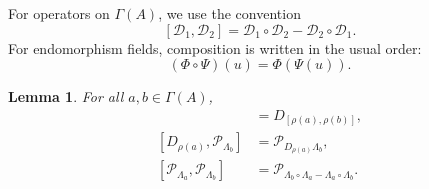 \documentclass[12pt,reqno]{amsart}
\newtheorem{lemma}[thm]{Lemma}
\theoremstyle{definition}
\theoremstyle{remark}
\begin{document}
For operators on \(\Gamma(A)\), we use the convention
\[
[\mathcal D_1,\mathcal D_2]
=
\mathcal D_1\circ\mathcal D_2
-
\mathcal D_2\circ\mathcal D_1.
\]
For endomorphism fields, composition is written in the usual order:
\[
(\Phi\circ\Psi)(u)=\Phi(\Psi(u)).
\]

\begin{lemma}
For all \(a,b\in\Gamma(A)\),
\begin{align}
[D_{\rho(a)},D_{\rho(b)}]
&=
D_{[\rho(a),\rho(b)]},
\label{eq:DD-commutator}
\\
[D_{\rho(a)},\mathcal P_{\Lambda_b}]
&=
\mathcal P_{D_{\rho(a)}\Lambda_b},
\label{eq:DP-commutator}
\\
[\mathcal P_{\Lambda_a},\mathcal P_{\Lambda_b}]
&=
\mathcal P_{
\Lambda_b\circ\Lambda_a
-
\Lambda_a\circ\Lambda_b
}.
\label{eq:PP-commutator}
\end{align}
\end{lemma}
\end{document}
